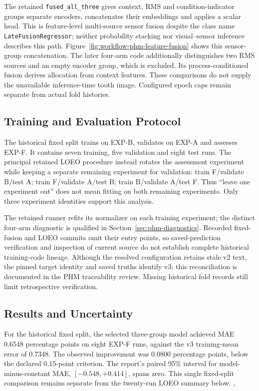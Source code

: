 The retained \texttt{fused\_all\_three} gives context, RMS and condition-indicator
groups separate encoders, concatenates their embeddings and applies a scalar head. This
is feature-level multi-source sensor fusion despite the class name
\texttt{LateFusionRegressor}; neither probability stacking nor visual--sensor inference
describes this path. Figure~\ref{fig:workflow-phm-feature-fusion} shows this
sensor-group concatenation. The later four-arm code additionally distinguishes two RMS sources
and an empty encoder group, which is excluded. Its process-conditioned fusion derives
allocation from context features. These comparisons do not supply the unavailable
inference-time tooth image. Configured epoch caps remain separate from actual fold
histories.

\subsection{Training and Evaluation Protocol}
The historical fixed split trains on EXP-B, validates on EXP-A and assesses EXP-F. It
contains seven training, five validation and eight test runs. The principal retained
LOEO procedure instead rotates the assessment experiment while keeping a separate
remaining experiment for validation: train F/validate B/test A; train F/validate A/test
B; train B/validate A/test F. Thus ``leave one experiment out'' does not mean fitting on
both remaining experiments. Only three experiment identities support this analysis.

The retained runner refits its normalizer on each training experiment; the distinct
four-arm diagnostic is qualified in Section~\ref{sec:phm-diagnostics}. Recorded fixed-fusion
and LOEO commits omit their entry points, so saved-prediction verification and inspection
of current source do not establish complete historical training-code lineage. Although
the resolved configuration retains stale v2 text, the pinned target identity and saved
truths identify v3; this reconciliation is documented in the PHM traceability review.
Missing historical fold records still limit retrospective verification.

\subsection{Results and Uncertainty}
For the historical fixed split, the selected three-group model achieved MAE 0.6548
percentage points on eight EXP-F runs, against the v3 training-mean error of 0.7348.
The observed improvement was 0.0800 percentage points, below the declared 0.15-point
criterion. The report's paired 95\% interval for model-minus-constant MAE,
$[-0.548,+0.414]$, spans zero. This single fixed-split comparison remains separate
from the twenty-run LOEO summary below.
{, }

